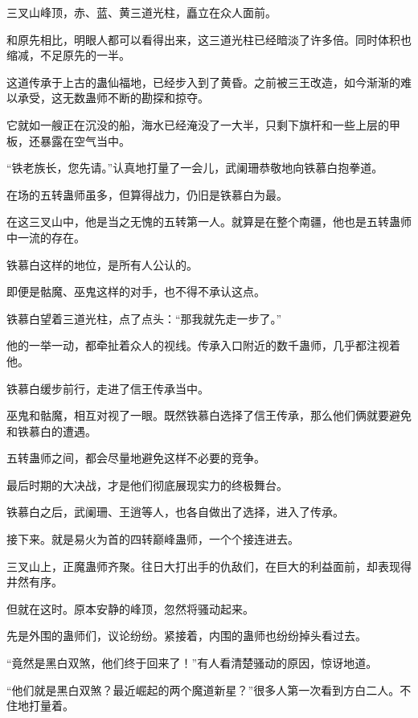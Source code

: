 
\begin{this_body}

三叉山峰顶，赤、蓝、黄三道光柱，矗立在众人面前。

和原先相比，明眼人都可以看得出来，这三道光柱已经暗淡了许多倍。同时体积也缩减，不足原先的一半。

这道传承于上古的蛊仙福地，已经步入到了黄昏。之前被三王改造，如今渐渐的难以承受，这无数蛊师不断的勘探和掠夺。

它就如一艘正在沉没的船，海水已经淹没了一大半，只剩下旗杆和一些上层的甲板，还暴露在空气当中。

“铁老族长，您先请。”认真地打量了一会儿，武阑珊恭敬地向铁慕白抱拳道。

在场的五转蛊师虽多，但算得战力，仍旧是铁慕白为最。

在这三叉山中，他是当之无愧的五转第一人。就算是在整个南疆，他也是五转蛊师中一流的存在。

铁慕白这样的地位，是所有人公认的。

即便是骷魔、巫鬼这样的对手，也不得不承认这点。

铁慕白望着三道光柱，点了点头：“那我就先走一步了。”

他的一举一动，都牵扯着众人的视线。传承入口附近的数千蛊师，几乎都注视着他。

铁慕白缓步前行，走进了信王传承当中。

巫鬼和骷魔，相互对视了一眼。既然铁慕白选择了信王传承，那么他们俩就要避免和铁慕白的遭遇。

五转蛊师之间，都会尽量地避免这样不必要的竞争。

最后时期的大决战，才是他们彻底展现实力的终极舞台。

铁慕白之后，武阑珊、王逍等人，也各自做出了选择，进入了传承。

接下来。就是易火为首的四转巅峰蛊师，一个个接连进去。

三叉山上，正魔蛊师齐聚。往日大打出手的仇敌们，在巨大的利益面前，却表现得井然有序。

但就在这时。原本安静的峰顶，忽然将骚动起来。

先是外围的蛊师们，议论纷纷。紧接着，内围的蛊师也纷纷掉头看过去。

“竟然是黑白双煞，他们终于回来了！”有人看清楚骚动的原因，惊讶地道。

“他们就是黑白双煞？最近崛起的两个魔道新星？”很多人第一次看到方白二人。不住地打量着。


\end{this_body}
